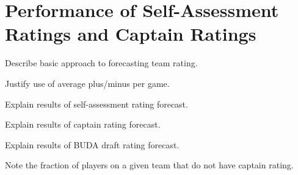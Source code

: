 \section{Performance of Self-Assessment Ratings and Captain Ratings}

Describe basic approach to forecasting team rating.

Justify use of average plus/minus per game.

Explain results of self-assessment rating forecast.

Explain results of captain rating forecast.

Explain results of BUDA draft rating forecast.

Note the fraction of players on a given team that do not have captain rating.